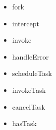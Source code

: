 \begin{itemize}
  \item fork
  \item intercept
  \item invoke
  \item handleError
  \item scheduleTask
  \item invokeTask
  \item cancelTask
  \item hasTask
\end{itemize}





















